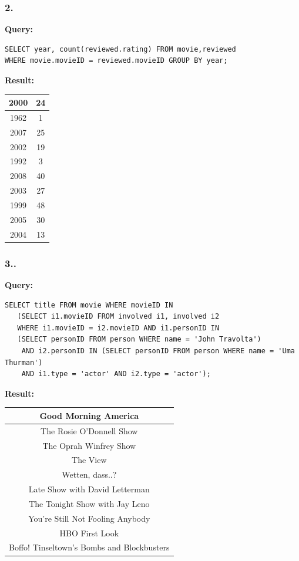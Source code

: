 \documentclass[10pt,a4paper,final]{report}
\begin{document}
\subsubsection*{2.}
\textbf{Query:}
\begin{lstlisting}
SELECT year, count(reviewed.rating) FROM movie,reviewed 
WHERE movie.movieID = reviewed.movieID GROUP BY year;
\end{lstlisting}

\textbf{Result:}

\begin{tabular}{|c|c|}
\hline 
2000 & 24 \\ 
\hline 
1962 & 1 \\ 
\hline 
2007 & 25 \\ 
\hline 
2002 & 19 \\ 
\hline 
1992 & 3 \\ 
\hline 
2008 & 40 \\ 
\hline 
2003 & 27 \\ 
\hline 
1999 & 48 \\ 
\hline 
2005 & 30 \\ 
\hline 
2004 & 13 \\ 
\hline 
\end{tabular} 

\subsubsection*{3..}
\textbf{Query:}
\begin{lstlisting}
SELECT title FROM movie WHERE movieID IN 
   (SELECT i1.movieID FROM involved i1, involved i2 
   WHERE i1.movieID = i2.movieID AND i1.personID IN 
   (SELECT personID FROM person WHERE name = 'John Travolta') 
    AND i2.personID IN (SELECT personID FROM person WHERE name = 'Uma Thurman') 
    AND i1.type = 'actor' AND i2.type = 'actor');
\end{lstlisting}
\textbf{Result:}

\begin{tabular}{|c|}
\hline 
Good Morning America \\ 
\hline 
The Rosie O'Donnell Show \\ 
\hline 
The Oprah Winfrey Show \\
\hline
The View \\ 
\hline 
Wetten, dass..? \\ 
\hline 
Late Show with David Letterman \\ 
\hline 
The Tonight  Show with Jay Leno \\ 
\hline 
You're Still Not Fooling Anybody \\ 
\hline 
HBO First Look \\ 
\hline 
Boffo! Tinseltown's Bombs and Blockbusters \\
\hline 
\end{tabular} 
\end{document}
